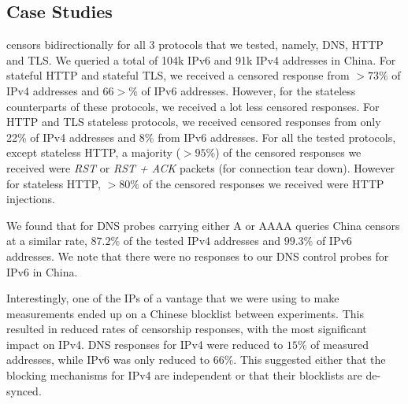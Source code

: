 \subsection{Case Studies}
\label{sec:prevalence:case}

censors bidirectionally for all 3 protocols that we tested, namely, DNS, HTTP and TLS. We queried a total of 104k IPv6 and 91k IPv4 addresses in China. For stateful HTTP and stateful TLS, we received a censored response from  $>73\%$ of IPv4 addresses and $66>\%$ of IPv6 addresses. However, for the stateless counterparts of these protocols, we received a lot less censored responses. For HTTP and TLS stateless protocols, we received censored responses from only 22\% of IPv4 addresses and 8\% from IPv6 addresses. For all the tested protocols, except stateless HTTP, a majority ($>95\%$) of the censored responses we received were \textit{RST} or \textit{RST + ACK} packets (for connection tear down). However for stateless HTTP, $>80\%$ of the censored responses we received were HTTP injections.


We found that for DNS probes carrying either A or AAAA queries China censors at
a similar rate, $87.2\%$ of the tested IPv4 addresses and $99.3\%$ of IPv6
addresses. We note that there were no responses to our DNS control probes for
IPv6 in China.


Interestingly, one of the IPs of a vantage that we were using to make
measurements ended up on a Chinese blocklist between experiments. This resulted
in reduced rates of censorship responses, with the most significant impact on
IPv4. DNS responses for IPv4 were reduced to $15\%$ of measured addresses, while
IPv6 was only reduced to $66\%$. This suggested either that the blocking
mechanisms for IPv4 are independent or that their blocklists are de-synced.


